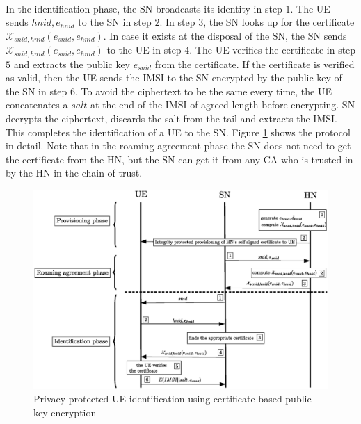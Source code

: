 \documentclass[lnicst,sechang,a4paper]{svmultln}
\begin{document}
\paragraph{}
In the identification phase, the SN broadcasts its identity in step $1$. The UE sends $hnid,e_{hnid}$ to the SN in step $2$. In step $3$, the SN looks up for the certificate $\mathcal{X}_{snid,hnid} (e_{snid},e_{hnid})$. In case it exists at the disposal of the SN, the SN sends $\mathcal{X}_{snid,hnid} (e_{snid},e_{hnid})$ to the UE in step $4$. The UE verifies the certificate in step $5$ and extracts the public key $e_{snid}$ from the certificate. If the certificate is verified as valid, then the UE sends the IMSI to the SN encrypted by the public key of the SN in step $6$. To avoid the ciphertext to be the same every time, the UE concatenates a $salt$ at the end of the IMSI of agreed length before encrypting. SN decrypts the ciphertext, discards the salt from the tail and extracts the IMSI. This completes the identification of a UE to the SN. Figure \ref{fig:solution_certificate} shows the protocol in detail. Note that in the roaming agreement phase the SN does not need to get the certificate from the HN, but the SN can get it from any CA who is trusted in by the HN in the chain of trust.
\begin{figure}
\begin{center}
  \includegraphics[width=.98\textwidth]{public_key_variation1.eps}
\caption{Privacy protected UE identification using certificate based public-key encryption}
\label{fig:solution_certificate}       %
\end{center}
\end{figure}
\end{document}
